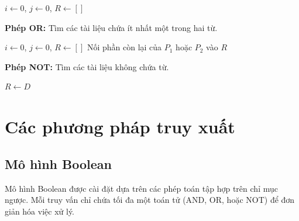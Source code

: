 \documentclass[../BTL.tex]{subfiles}
\begin{document}
\begin{algorithm}[H]
\caption{Intersect (Phép AND)}
\SetAlgoLined
{}
$i \leftarrow 0$, $j \leftarrow 0$, $R \leftarrow []$\;
\end{algorithm}

\textbf{Phép OR:} Tìm các tài liệu chứa ít nhất một trong hai từ.

\begin{algorithm}[H]
\caption{Union (Phép OR)}
\SetAlgoLined
{}
$i \leftarrow 0$, $j \leftarrow 0$, $R \leftarrow []$\;
Nối phần còn lại của $P_1$ hoặc $P_2$ vào $R$\;
\end{algorithm}

\textbf{Phép NOT:} Tìm các tài liệu không chứa từ.

\begin{algorithm}[H]
\caption{Complement (Phép NOT)}
\SetAlgoLined
{}
$R \leftarrow D$\;
\end{algorithm}


\section{Các phương pháp truy xuất}
\subsection{Mô hình Boolean}

Mô hình Boolean được cài đặt dựa trên các phép toán tập hợp trên chỉ mục ngược. Mỗi truy vấn chỉ chứa tối đa một toán tử (AND, OR, hoặc NOT) để đơn giản hóa việc xử lý.
\end{document}
